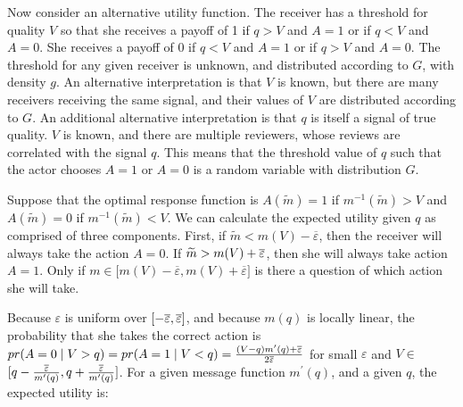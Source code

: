 \documentclass[12pt]{article}
\begin{document}
\onehalfspacing
Now consider an alternative utility function. The receiver has a threshold
for quality $V$ so that she receives a payoff of 1 if $q>V$ and $A=1$ or if $%
q<V$ and $A=0$. She receives a payoff of 0 if $q<V$ and $A=1$ or if $q>V$
and $A=0$. The threshold for any given receiver is unknown, and distributed
according to $G$, with density $g$. An alternative interpretation is that $V$
is known, but there are many receivers receiving the same signal, and their
values of $V$ are distributed according to $G$. An additional alternative
interpretation is that $q$ is itself a signal of true quality. $V$ is known,
and there are multiple reviewers, whose reviews are correlated with the
signal $q$. This means that the threshold value of $q$ such that the actor
chooses $A=1$ or $A=0$ is a random variable with distribution $G$. 

Suppose that the optimal response function is $A(\widetilde{m})=1$ if $%
m^{-1}(\widetilde{m})>V$ and $A(\widetilde{m})=0$ if $m^{-1}(\widetilde{m}%
)<V $. We can calculate the expected utility given $q$ as comprised of three
components. First, if $\widetilde{m}<m(V)-\overline{\varepsilon }$, then the
receiver will always take the action $A=0$. If $\widetilde{m}>m(V)+\overline{%
\varepsilon }$, then she will always take action $A=1$. Only if $m\in
\lbrack m(V)-\overline{\varepsilon },m(V)+\overline{\varepsilon }]$ is there
a question of which action she will take.

Because $\varepsilon $ is uniform over $[-\overline{\varepsilon },\overline{%
\varepsilon }]$, and because $m(q)$ is locally linear, the probability that
she takes the correct action is $pr(A=0\mid V>q)=pr(A=1\mid V<q)=\frac{%
\left( V-q\right) m^{\prime }(q)+\overline{\varepsilon }}{2\overline{%
\varepsilon }}$ for small $\varepsilon $ and $V\in $ $[q-\frac{\overline{%
\varepsilon }}{m^{\prime }(q)},q+\frac{\overline{\varepsilon }}{m^{\prime
}(q)}]$. For a given message function $m^{\prime }(q)$, and a given $q$, the
expected utility is: \bigskip
\end{document}
